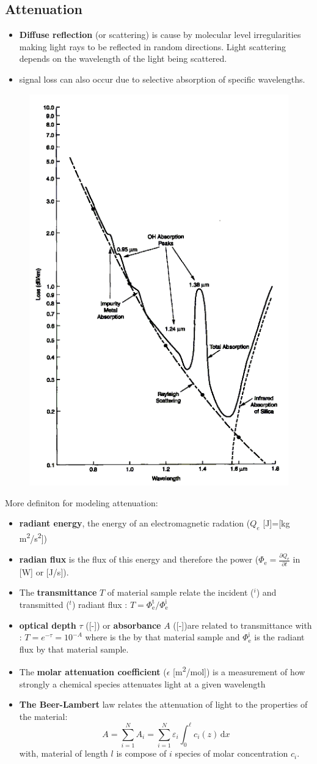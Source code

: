 \documentclass[twocolumn]{article}
\numberwithin{equation}{section}
\begin{document}
	\subsection{Attenuation}
\begin{itemize}
	\item \textbf{Diffuse reflection} (or scattering) is cause by  molecular level irregularities making light rays to be reflected in random directions. Light scattering depends on the wavelength of the light being scattered.
	\item signal loss can also occur due to selective absorption of specific wavelengths.
\end{itemize}
\begin{figure}[H]
	\centering
	\includegraphics[width=.25\textwidth]{Fibre-Optic-Spectral-Attenuation-Graph.png}
\end{figure}
More definiton for modeling attenuation:
\begin{itemize}
	\item \textbf{radiant energy}, the energy of an electromagnetic radation ($Q_e$ [J]=[kg m\textsuperscript{2}/s\textsuperscript{2}]) 
	\item \textbf{radian flux} is the flux of this energy and therefore the power ($\Phi_\mathrm{e} = \frac{\partial Q_\mathrm{e}}{\partial t}$ in [W] or [J/s]). 
	\item The \textbf{transmittance} $T$ of material sample relate the incident ($^i$) and transmitted ($^t$) radiant flux : $T = {\Phi_\mathrm{e}^\mathrm{t}}/{\Phi_\mathrm{e}^\mathrm{i}}$
	\item \textbf{optical depth} $\tau$ ([-]) or \textbf{absorbance} $A$ ([-])are related to transmittance with : $T = e^{-\tau} = 10^{-A}$
where  is the by that material sample and $\Phi_\mathrm{e}^\mathrm{i}$ is the radiant flux  by that material sample.
	\item The \textbf{molar attenuation coefficient} ($\epsilon$ [m\textsuperscript{2}/mol]) is a measurement of how strongly a chemical species attenuates light at a given wavelength
	\item \textbf{The Beer-Lambert} law relates the attenuation of light to the properties of the material:
	$$A = \sum_{i = 1}^N A_i = \sum_{i = 1}^N \varepsilon_i \int_0^\ell c_i(z)\,\mathrm{d}x$$
	with, material of length $l$ is compose of $i$ species of molar concentration $c_i$.
\end{itemize}
\end{document}
